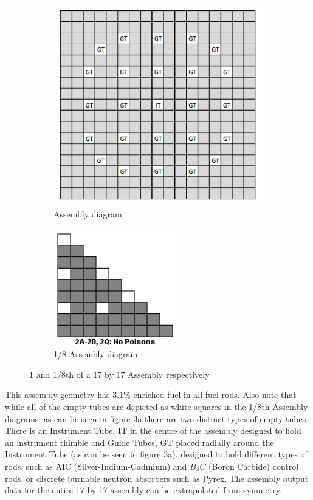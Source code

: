 \documentclass[12pt]{article}
\begin{document}
 \begin{figure} [htb!]
\centering
\begin{subfigure}{.5\textwidth}
  \centering
  \includegraphics[scale=0.4]{Figures/Assembly Geometry 1.png}
  \caption{Assembly diagram}
  \label{fig:sub1}
\end{subfigure}%
\begin{subfigure}{.5\textwidth}
  \centering
  \includegraphics[scale=0.7]{Figures/1:8 assembly diagram .png}
  \caption{1/8 Assembly diagram}
  \label{fig:sub2}
\end{subfigure}
\caption{1 and 1/8th of a 17 by 17 Assembly respectively}
\label{fig:test}
\end{figure}
 
 This assembly geometry has 3.1\% enriched fuel in all fuel rods. Also note that while all of the empty tubes are depicted as white squares in the 1/8th Assembly diagrams, as can be seen in figure 3a there are two distinct types of empty tubes. There is an Instrument Tube, IT in the centre of the assembly designed to hold an instrument thimble and Guide Tubes, GT placed radially around the Instrument Tube (as can be seen in figure 3a), designed to hold different types of rods, such as AIC (Silver-Indium-Cadmium) and $B_4C$ (Boron Carbide) control rods, or discrete burnable neutron absorbers such as Pyrex. The assembly output data for the entire 17 by 17 assembly can be extrapolated from symmetry.
\end{document}

